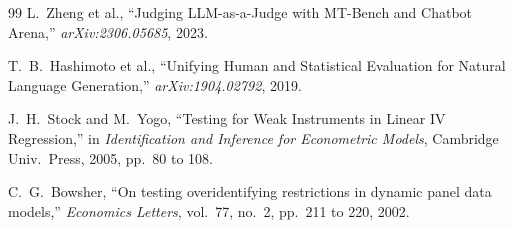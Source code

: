 \documentclass[conference]{IEEEtran}
\begin{document}
\begin{thebibliography}{99}
L.~Zheng et al., ``Judging LLM-as-a-Judge with MT-Bench and Chatbot Arena,'' \emph{arXiv:2306.05685}, 2023.

T.~B.~Hashimoto et al., ``Unifying Human and Statistical Evaluation for Natural Language Generation,'' \emph{arXiv:1904.02792}, 2019.

J.~H.~Stock and M.~Yogo, ``Testing for Weak Instruments in Linear IV Regression,'' in \emph{Identification and Inference for Econometric Models}, Cambridge Univ.\ Press, 2005, pp.~80 to 108.

C.~G.~Bowsher, ``On testing overidentifying restrictions in dynamic panel data models,'' \emph{Economics Letters}, vol.~77, no.~2, pp.~211 to 220, 2002.

\end{thebibliography}
\end{document}
